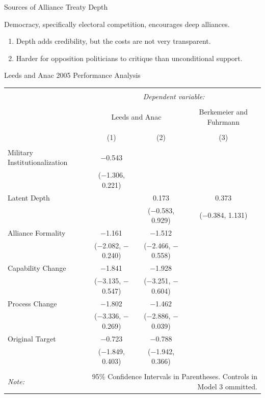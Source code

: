 \documentclass[12pt]{beamer}
\begin{document}

\begin{frame}{Sources of Alliance Treaty Depth}

Democracy, specifically electoral competition, encourages deep alliances. 
\begin{enumerate}
\item Depth adds credibility, but the costs are not very transparent. 
\item Harder for opposition politicians to critique than unconditional support.  
\end{enumerate}

\end{frame}



\begin{frame}{Leeds and Anac 2005 Performance Analysis}

\begin{table}[!htbp] \centering 
\begin{adjustbox}{width= .95\textwidth, center}
\begin{tabular}{@{\extracolsep{5pt}}lccc} 
\\[-1.8ex]\hline 
\hline \\[-1.8ex] 
 & \multicolumn{3}{c}{\textit{Dependent variable:}} \\ 
\cline{2-4} 
\\[-1.8ex] & \multicolumn{2}{c}{Leeds and Anac} & Berkemeier and Fuhrmann \\ 
\\[-1.8ex] & (1) & (2) & (3)\\ 
\hline \\[-1.8ex] 
 Military Institutionalization & $-$0.543 &  &  \\ 
  & ($-$1.306, 0.221) &  &  \\ 
  Latent Depth &  & 0.173 & 0.373 \\ 
  &  & ($-$0.583, 0.929) & ($-$0.384, 1.131) \\ 
  Alliance Formality & $-$1.161$^{}$ & $-$1.512$^{}$ &  \\ 
  & ($-$2.082, $-$0.240) & ($-$2.466, $-$0.558) &  \\ 
  Capability Change & $-$1.841$^{}$ & $-$1.928$^{}$ &  \\ 
  & ($-$3.135, $-$0.547) & ($-$3.251, $-$0.604) &  \\ 
  Process Change & $-$1.802$^{}$ & $-$1.462$^{}$ &  \\ 
  & ($-$3.336, $-$0.269) & ($-$2.886, $-$0.039) &  \\ 
  Original Target & $-$0.723 & $-$0.788 &  \\ 
  & ($-$1.849, 0.403) & ($-$1.942, 0.366) &  \\ 
\hline \\[-1.8ex] 
\textit{Note:}  & \multicolumn{3}{r}{95\% Confidence Intervals in Parentheses. Controls in Model 3 ommitted.} \\ 
\end{tabular}
\end{adjustbox} 
\end{table}


\end{frame}
\end{document}

